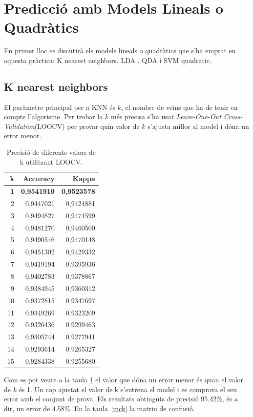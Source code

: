 \section{Predicció amb Models Lineals o Quadràtics}
En primer lloc es discutirà els models lineals o quadràtics que s'ha emprat en aquesta pràctica: K nearest neighbors, LDA , QDA i SVM quadratic.
\subsection{K nearest neighbors}
El paràmetre principal per a KNN és $k$, el nombre de veïns que ha de tenir en compte l'algorisme. Per trobar la $k$ més precisa s'ha usat \textit{Leave-One-Out Cross-Validation}(LOOCV) per provar quin valor de $k$ s'ajusta millor al model i dóna un error menor.
\begin{table}[H]
	\centering
	\def\arraystretch{1.2}
	\begin{tabular}{|rrr|}
		\hline
		k  & Accuracy & Kappa \\
		\hline
		\textbf{1}  &  \textbf{0,9541919} & \textbf{0,9523578} \\
		2  &  0,9447021 & 0,9424881 \\
		3  &  0,9494827 & 0,9474599 \\
		4  &  0,9481270 & 0,9460500 \\
		5  &  0,9490546 & 0,9470148 \\
		6  &  0,9451302 & 0,9429332 \\
		7  &  0,9419194 & 0,9395936 \\
		8  &  0,9402783 & 0,9378867 \\
		9  &  0,9384945 & 0,9360312 \\
        10 &  0.9372815 & 0.9347697 \\
        11 &  0.9349269 & 0.9323209 \\
        12 &  0.9326436 & 0.9299463 \\
        13 &  0.9305744 & 0.9277941 \\
        14 &  0.9293614 & 0.9265327 \\
        15 &  0.9284338 & 0.9255680 \\
		\hline
	\end{tabular}
	\caption{Precisió de diferents valors de k utilitzant LOOCV.}
	\label{tab:nnet_k}
\end{table}
Com es pot veure a la taula \ref{tab:nnet_k} el valor que dóna un error menor és quan el valor de $k$ és 1.
Un cop ajustat el valor de k s'entrena el model i es comprova el seu error amb el conjunt de prova. Els resultats obtinguts de precisió 95.42\%, és a dir, un error de 4.58\%. En la taula~\ref{mck} la matriu de confusió.

